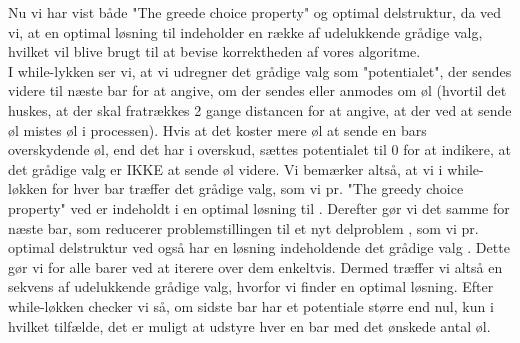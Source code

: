 Nu vi har vist både "The greede choice property" og optimal delstruktur, da ved vi, at en optimal løsning til  indeholder en række af udelukkende grådige valg, hvilket vil blive brugt til at bevise korrektheden af vores algoritme.\\
I while-lykken ser vi, at vi udregner det grådige valg som "potentialet", der sendes videre til næste bar for at angive, om der sendes eller anmodes om øl (hvortil det huskes, at der skal fratrækkes 2 gange distancen for at angive, at der ved at sende øl mistes øl i processen). Hvis at det koster mere øl at sende en bars overskydende øl, end det har i overskud, sættes potentialet til 0 for at indikere, at det grådige valg er IKKE at sende øl videre.
Vi bemærker altså, at vi i while-løkken for hver bar træffer det grådige valg, som vi pr. "The greedy choice property" ved er indeholdt i en optimal løsning til . Derefter gør vi det samme for næste bar, som reducerer problemstillingen til et nyt delproblem , som vi pr. optimal delstruktur ved også har en løsning indeholdende det grådige valg . Dette gør vi for alle barer ved at iterere over dem enkeltvis. Dermed træffer vi altså en sekvens af udelukkende grådige valg, hvorfor vi finder en optimal løsning.
Efter while-løkken checker vi så, om sidste bar har et potentiale større end nul, kun i hvilket tilfælde, det er muligt at udstyre hver en bar med det ønskede antal øl. 
